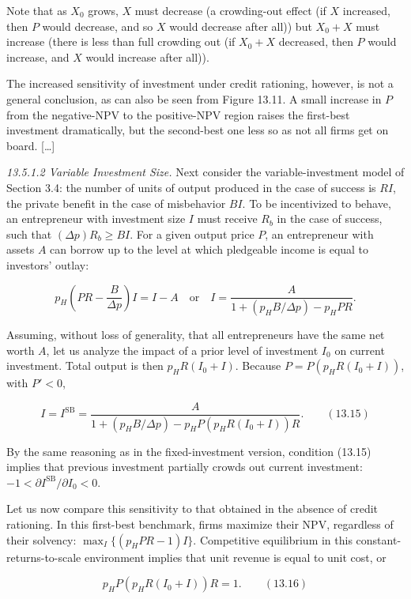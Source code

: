 \documentclass[11pt,a4paper]{article}
\begin{document}
Note that as \(X_0\) grows, \(X\) must decrease (a crowding-out effect (if \(X\) increased, then
\(P\) would decrease, and so \(X\) would decrease after all)) but \(X_0 + X\) must increase (there
is less than full crowding out (if \(X_0 + X\) decreased, then \(P\) would increase, and \(X\) would
increase after all)).

The increased sensitivity of investment under credit rationing, however, is not a general
conclusion, as can also be seen from Figure 13.11. A small increase in \(P\) from the negative-NPV
to the positive-NPV region raises the first-best investment dramatically, but the second-best one
less so as not all firms get on board. {[}\ldots{]}

\emph{13.5.1.2 Variable Investment Size.} Next consider the variable-investment model of Section
3.4: the number of units of output produced in the case of success is \(RI\), the private benefit in
the case of misbehavior \(BI\). To be incentivized to behave, an entrepreneur with investment size
\(I\) must receive \(R_b\) in the case of success, such that \((\Delta p)R_b \geqslant BI\). For a
given output price \(P\), an entrepreneur with assets \(A\) can borrow up to the level at which
pledgeable income is equal to investors' outlay:

\[p_H\left(PR - \frac{B}{\Delta p}\right)I = I - A \quad\text{or}\quad I = \frac{A}{1 + (p_H B/\Delta p) - p_H PR}.\]

Assuming, without loss of generality, that all entrepreneurs have the same net worth \(A\), let us
analyze the impact of a prior level of investment \(I_0\) on current investment. Total output is
then \(p_H R(I_0 + I)\). Because \(P = P(p_H R(I_0 + I))\), with \(P' < 0\),

\[I = I^{\text{SB}} = \frac{A}{1 + (p_H B/\Delta p) - p_H P(p_H R(I_0 + I))R}. \qquad (13.15)\]

By the same reasoning as in the fixed-investment version, condition (13.15) implies that previous
investment partially crowds out current investment:
\(-1 < \partial I^{\text{SB}}/\partial I_0 < 0\).

Let us now compare this sensitivity to that obtained in the absence of credit rationing. In this
first-best benchmark, firms maximize their NPV, regardless of their solvency:
\(\max_I \{(p_H PR - 1)I\}\). Competitive equilibrium in this constant-returns-to-scale environment
implies that unit revenue is equal to unit cost, or

\[p_H P(p_H R(I_0 + I))R = 1. \qquad (13.16)\]
\end{document}
